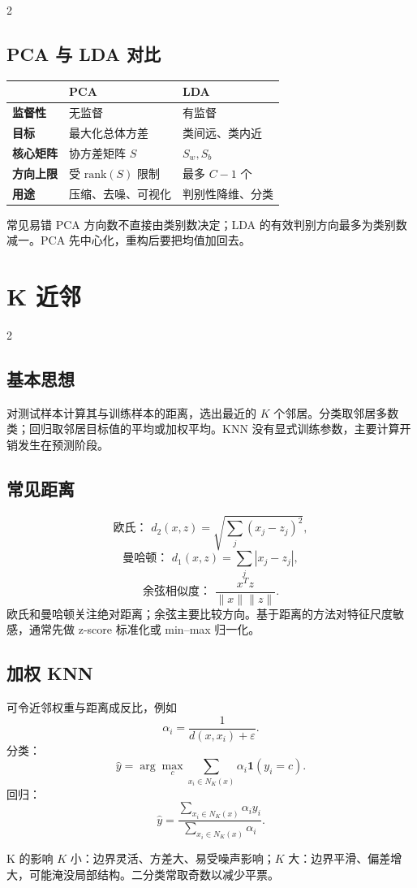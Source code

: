 \documentclass[9pt,a4paper,UTF8]{ctexart}
\begin{document}
\begin{multicols}{2}
\subsection{PCA 与 LDA 对比}
\begin{tabularx}{\columnwidth}{>{\bfseries}p{}XX}
\toprule
& PCA & LDA\\\midrule
监督性 & 无监督 & 有监督\\
目标 & 最大化总体方差 & 类间远、类内近\\
核心矩阵 & 协方差矩阵 $S$ & $S_w,S_b$\\
方向上限 & 受 $\mathrm{rank}(S)$ 限制 & 最多 $C-1$ 个\\
用途 & 压缩、去噪、可视化 & 判别性降维、分类\\
\bottomrule
\end{tabularx}

\begin{warnbox}{常见易错}
PCA 方向数不直接由类别数决定；LDA 的有效判别方向最多为类别数减一。PCA 先中心化，重构后要把均值加回去。
\end{warnbox}
\end{multicols}

\section{K 近邻}
\begin{multicols}{2}
\subsection{基本思想}
对测试样本计算其与训练样本的距离，选出最近的 $K$ 个邻居。分类取邻居多数类；回归取邻居目标值的平均或加权平均。KNN 没有显式训练参数，主要计算开销发生在预测阶段。

\subsection{常见距离}
\[
\text{欧氏： }d_2(x,z)=\sqrt{\sum_j(x_j-z_j)^2},
\]
\[
\text{曼哈顿： }d_1(x,z)=\sum_j|x_j-z_j|,
\]
\[
\text{余弦相似度： }\frac{x^Tz}{\|x\|\|z\|}.
\]
欧氏和曼哈顿关注绝对距离；余弦主要比较方向。基于距离的方法对特征尺度敏感，通常先做 z-score 标准化或 min--max 归一化。

\subsection{加权 KNN}
可令近邻权重与距离成反比，例如
\[
\alpha_i=\frac{1}{d(x,x_i)+\varepsilon}.
\]
分类：
\[
\hat y=\arg\max_c\sum_{x_i\in N_K(x)}\alpha_i\mathbf 1(y_i=c).
\]
回归：
\[
\hat y=\frac{\sum_{x_i\in N_K(x)}\alpha_i y_i}{\sum_{x_i\in N_K(x)}\alpha_i}.
\]

\begin{keybox}{K 的影响}
$K$ 小：边界灵活、方差大、易受噪声影响；$K$ 大：边界平滑、偏差增大，可能淹没局部结构。二分类常取奇数以减少平票。
\end{keybox}
\end{multicols}
\end{document}
